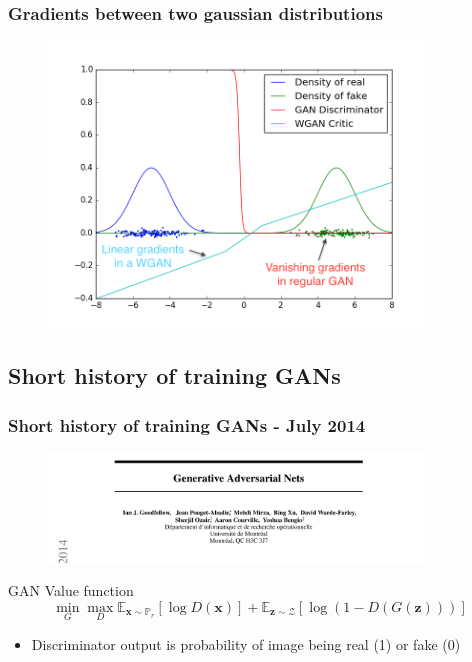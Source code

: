 \documentclass{Bredelebeamer}
\begin{document}
\begin{frame}
	\frametitle{Gradients between two gaussian distributions}
	\begin{figure}[h!]
		\centering
		\includegraphics[width=0.9\textwidth]{gan_gradients_gauss.png}
	\end{figure}
\end{frame}

\subsection{Short history of training GANs}
\begin{frame}
	\frametitle{Short history of training GANs - July 2014}
	\begin{figure}[h!]
		\centering
		\includegraphics[width=0.9\textwidth]{original_paper.png}
	\end{figure}
	\begin{exampleblock}{GAN Value function}
	\[
		\min_G \max_D \mathbb{E}_{\bm{x} \sim \mathbb{P}_r} \left[ \log D(\bm{x}) \right] + \mathbb{E}_{\bm{z} \sim \mathcal{Z}} \left[ \log (1 -  D(G(\bm{z})))  \right] 
	\]
	\end{exampleblock}
	\begin{itemize}
		\item Discriminator output is probability of image being real (1) or fake (0)
	\end{itemize}
\end{frame}
\end{document}
